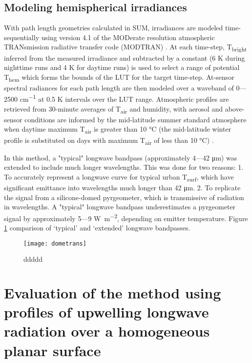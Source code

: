 \subsection{Modeling hemispherical irradiances}
With path length geometries calculated in SUM, irradiances are modeled time-sequentially using version 4.1 of the MODerate resolution atmospheric TRANsmission radiative transfer code (MODTRAN) \cite{Berk1987}. At each time-step, T\textsubscript{bright} inferred from the measured irradiance and subtracted by a constant (6 \si{K} during nighttime runs and 4 \si{K} for daytime runs) is used to select a range of potential T\textsubscript{hem} which forms the bounds of the LUT for the target time-step. At-sensor spectral radiances for each path length are then modeled over a waveband of 0---2500 \si{cm^{-1}} at 0.5 \si{K} intervals over the LUT range. Atmospheric profiles are retrieved from 30-minute averages of T\textsubscript{air} and humidity, with aerosol and above-sensor conditions are informed by the mid-latitude summer standard atmosphere when daytime maximum T\textsubscript{air} is greater than 10 \si{\degreeCelsius} (the mid-latitude winter profile is substituted on days with maximum T\textsubscript{air} of less than 10 \si{\degreeCelsius}) \cite{Kantor1962}. 

In this method, a "typical" longwave bandpass (approximately 4---42 \si{\micro\meter}) was extended to include much longer wavelengths. This was done for two reasons: 1. To accurately represent a longwave curve for typical urban T\textsubscript{surf}, which have significant emittance into wavelengths much longer than 42 \si{\micro\meter}. 2. To replicate the signal from a silicone-domed pyrgeometer, which is transmissive of radiation in wavelengths. A "typical" longwave bandpass underestimates a pyrgeometer signal by approximately 5---9 \si{\watt\per\square\meter}, depending on emitter temperature. Figure \ref{dometrans} comparison of ‘typical’ and ‘extended’ longwave bandpasses.

\begin{figure}[!ht]
	\texttt{[image: dometrans]}
	\label{dometrans}
	\caption{ddddd}
\end{figure}




\section{Evaluation of the method using profiles of upwelling longwave radiation over a homogeneous planar surface}

